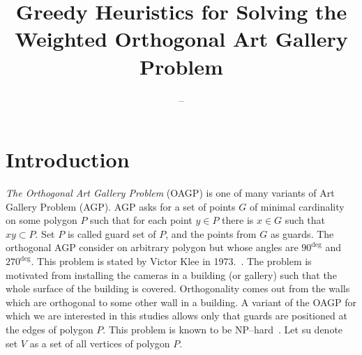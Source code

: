 \documentclass[runningheads,a4paper]{llncs}
\begin{document}
    \mainmatter  %

    \title{Greedy Heuristics for Solving the Weighted Orthogonal Art Gallery Problem}

    \author{--}

    \institute{%
    }

    \maketitle


    \section{Introduction}\label{sec:introduction}
     \emph{The Orthogonal Art Gallery Problem} (OAGP) is one of many variants of Art Gallery Problem (AGP). AGP asks for a set of points $G$ of minimal cardinality on some polygon $P$ such that for each point $y \in P$ there is $x \in G$ such that $xy \subset P$.  Set $P$ is called guard set of $P$, and the points from $G$ as guards. The orthogonal AGP consider on arbitrary polygon but whose angles are $90^{\deg}$ and $270^{\deg}$. This problem is stated by Victor  Klee in 1973.~\cite{o1987art}. The problem is motivated from installing the cameras in a building (or gallery) such that the whole surface of the building is covered. Orthogonality comes out from the walls which are orthogonal to some other wall in a building. A variant of the OAGP for which we are interested in this studies allows only that guards are positioned at the edges of polygon $P$. This problem is known to be NP--hard~\cite{devadoss2011discrete}. Let su denote set $V$ as a set of all vertices of polygon $P$.
\end{document}
